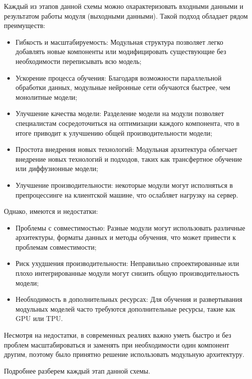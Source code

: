 Каждый из этапов данной схемы можно охарактеризовать входными данными и результатом работы модуля (выходными данными).
Такой подход обладает рядом преимуществ:
\begin{itemize}
    \item Гибкость и масштабируемость: Модульная структура позволяет легко добавлять новые компоненты или модифицировать существующие без необходимости переписывать всю модель;
    \item Ускорение процесса обучения: Благодаря возможности параллельной обработки данных, модульные нейронные сети обучаются быстрее, чем монолитные модели;
    \item Улучшение качества модели: Разделение модели на модули позволяет специалистам сосредоточиться на оптимизации каждого компонента, что в итоге приводит к улучшению общей производительности модели;
    \item Простота внедрения новых технологий: Модульная архитектура облегчает внедрение новых технологий и подходов, таких как трансфертное обучение или диффузионные модели;
    \item Улучшение производительности: некоторые модули могут исполняться в препроцессинге на клиентской машине, что ослабляет нагрузку на сервер.
\end{itemize}
Однако, имеются и недостатки:
\begin{itemize}
    \item Проблемы с совместимостью: Разные модули могут использовать различные архитектуры, форматы данных и методы обучения, что может привести к проблемам совместимости;
    \item Риск ухудшения производительности: Неправильно спроектированные или плохо интегрированные модули могут снизить общую производительность модели;
    \item Необходимость в дополнительных ресурсах: Для обучения и развертывания модульных моделей часто требуются дополнительные ресурсы, такие как GPU или TPU.
\end{itemize}

Несмотря на недостатки, в современных реалиях важно уметь быстро и без проблем масштабироваться и заменять при необходимости один компонент другим, поэтому было принятно решение использовать модульную архитектуру.

Подробнее разберем каждый этап данной схемы.